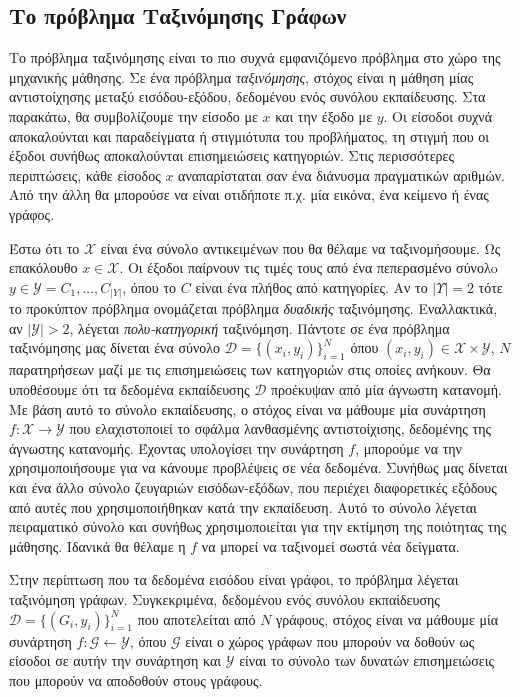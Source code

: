\subsection{Το πρόβλημα Ταξινόμησης Γράφων}
\label{subsection:graph_classification}
Το πρόβλημα ταξινόμησης είναι το πιο συχνά εμφανιζόμενο πρόβλημα στο χώρο της μηχανικής μάθησης.
Σε ένα πρόβλημα \textit{ταξινόμησης}, στόχος είναι η μάθηση μίας αντιστοίχησης μεταξύ εισόδου-εξόδου, δεδομένου ενός συνόλου εκπαίδευσης.
Στα παρακάτω, θα συμβολίζουμε την είσοδο με $x$ και την έξοδο με $y$.
Οι είσοδοι συχνά αποκαλούνται και παραδείγματα ή στιγμιότυπα του προβλήματος, τη στιγμή που οι έξοδοι συνήθως αποκαλούνται επισημειώσεις κατηγοριών.
Στις περισσότερες περιπτώσεις, κάθε είσοδος $x$ αναπαρίσταται σαν ένα διάνυσμα πραγματικών αριθμών.
Από την άλλη θα μπορούσε να είναι οτιδήποτε π.χ. μία εικόνα, ένα κείμενο ή ένας γράφος.\par
Έστω ότι το $\mathcal{X}$ είναι ένα σύνολο αντικειμένων που θα θέλαμε να ταξινομήσουμε.
Ως επακόλουθο $x \in \mathcal{X}$.
Οι έξοδοι παίρνουν τις τιμές τους από ένα πεπερασμένο σύνολo $y \in \mathcal{Y} = {C_{1}, \dots, C_{|Y|}}$, όπου το $C$ είναι ένα πλήθος από κατηγορίες.
Αν το $|\mathcal{Υ}| = 2$ τότε το προκύπτον πρόβλημα ονομάζεται πρόβλημα \textit{δυαδικής} ταξινόμησης.
Εναλλακτικά, αν $|\mathcal{Y}| > 2$, λέγεται \textit{πολυ-κατηγορική} ταξινόμηση.
Πάντοτε σε ένα πρόβλημα ταξινόμησης μας δίνεται ένα σύνολο $\mathcal{D} = \{(x_{i}, y_{i})\}^{N}_{i=1}$ όπου $(x_{i}, y_{i}) \in \mathcal{X} \times \mathcal{Y}$, $Ν$ παρατηρήσεων μαζί με τις επισημειώσεις των κατηγοριών στις οποίες ανήκουν.
Θα υποθέσουμε ότι τα δεδομένα εκπαίδευσης $\mathcal{D}$ προέκυψαν από μία άγνωστη κατανομή.
Με βάση αυτό το σύνολο εκπαίδευσης, ο στόχος είναι να μάθουμε μία συνάρτηση $f: \mathcal{X} \rightarrow \mathcal{Y}$ που ελαχιστοποιεί το σφάλμα λανθασμένης αντιστοίχισης, δεδομένης της άγνωστης κατανομής.
Έχοντας υπολογίσει την συνάρτηση $f$, μπορούμε να την χρησιμοποιήσουμε για να κάνουμε προβλέψεις σε νέα δεδομένα.
Συνήθως μας δίνεται και ένα άλλο σύνολο ζευγαριών εισόδων-εξόδων, που περιέχει διαφορετικές εξόδους από αυτές που χρησιμοποιήθηκαν κατά την εκπαίδευση.
Αυτό το σύνολο λέγεται πειραματικό σύνολο και συνήθως χρησιμοποιείται για την εκτίμηση της ποιότητας της μάθησης.
Ιδανικά θα θέλαμε η $f$ να μπορεί να ταξινομεί σωστά νέα δείγματα.\par
Στην περίπτωση που τα δεδομένα εισόδου είναι γράφοι, το πρόβλημα λέγεται ταξινόμηση γράφων.
Συγκεκριμένα, δεδομένου ενός συνόλου εκπαίδευσης $\mathcal{D} = \{(G_{i}, y_{i})\}^{N}_{i=1}$ που αποτελείται από $N$ γράφους, στόχος είναι να μάθουμε μία συνάρτηση $f: \mathcal{G} \leftarrow \mathcal{Y}$, όπου $\mathcal{G}$ είναι ο χώρος γράφων που μπορούν να δοθούν ως είσοδοι σε αυτήν την συνάρτηση και $\mathcal{Y}$ είναι το σύνολο των δυνατών επισημειώσεις που μπορούν να αποδοθούν στους γράφους.

